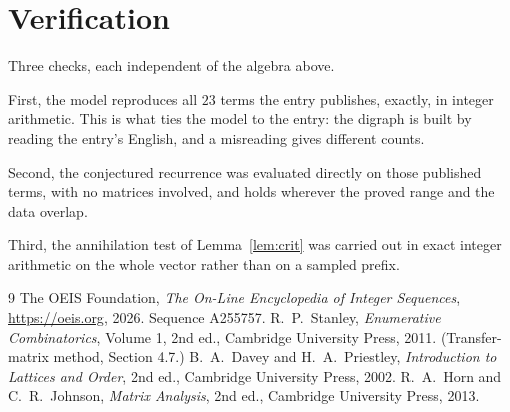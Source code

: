\documentclass[11pt,a4paper]{article}
\theoremstyle{plain}
\theoremstyle{definition}
\begin{document}
\section{Verification}

Three checks, each independent of the algebra above.

First, the model reproduces all $23$ terms the entry publishes, exactly, in integer
arithmetic. This is what ties the model to the entry: the digraph is built by reading the
entry's English, and a misreading gives different counts.

Second, the conjectured recurrence was evaluated directly on those published terms, with no
matrices involved, and holds wherever the proved range and the data overlap.

Third, the annihilation test of Lemma~\ref{lem:crit} was carried out in exact integer
arithmetic on the whole vector rather than on a sampled prefix.

\begin{thebibliography}{9}
 The OEIS Foundation, \emph{The On-Line Encyclopedia of Integer
Sequences}, \url{https://oeis.org}, 2026. Sequence A255757.
 R.~P.~Stanley, \emph{Enumerative Combinatorics}, Volume 1, 2nd ed.,
Cambridge University Press, 2011. (Transfer-matrix method, Section 4.7.)
 B.~A.~Davey and H.~A.~Priestley, \emph{Introduction to Lattices and
Order}, 2nd ed., Cambridge University Press, 2002.
 R.~A.~Horn and C.~R.~Johnson, \emph{Matrix Analysis}, 2nd ed., Cambridge
University Press, 2013.
\end{thebibliography}
\end{document}
